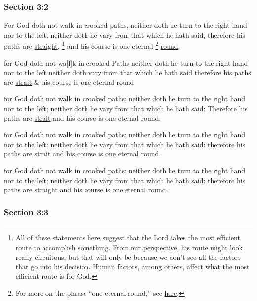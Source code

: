 	\subsubsection{Section 3:2} %
		\label{DC3-2}

		For God doth not walk in crooked paths, neither doth he turn to the right hand nor to the left, neither doth he vary from that which he hath said, therefore his paths are \hyperref[STRAIGHT]{straight},%
			\footnote{%
				All of these statements here suggest that the Lord takes the most efficient route to accomplish something. From our perspective, his route might look really circuitous, but that will only be because we don't see all the factors that go into his decision. Human factors, among others, affect what the most efficient route is for God.
				}
		and his course is one eternal 
			\footnote{%
				For more on the phrase ``one eternal round,'' see \hyperref[ROUND-PHRASES]{here}.
				}%
		\hyperref[ROUND]{round}.

		\begin{framed}
		\scriptsize
			\begin{compactdesc}
				\item[JSP] for God doth not wa[l]k in crooked Paths neither doth he turn to the right hand nor to the left neither doth vary from that which he hath said therefore his paths are \hyperref[STRAIT]{strait} \& his course is one eternal round
				\item[BC] for God doth not walk in crooked paths; neither doth he turn to the right hand nor to the left; neither doth he vary from that which he hath said: Therefore his paths are \hyperref[STRAIT]{strait} and his course is one eternal round.
				\item[DC 1835] for God doth not walk in crooked paths; neither doth he turn to the right hand nor to the left: neither doth he vary from that which he hath said: therefore his paths are \hyperref[STRAIT]{strait} and his course is one eternal round.
				\item[DC 1844] for God doth not walk in crooked paths; neither doth he turn to the right hand nor to the left; neither doth he vary from that which he hath said: therefore his paths are \hyperref[STRAIGHT]{straight} and his course is one eternal round.
			\end{compactdesc}
		\end{framed}

	\subsubsection{Section 3:3} %
		\label{DC3-3}

